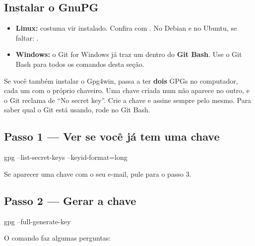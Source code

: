 \subsection{Instalar o GnuPG}

\begin{itemize}
  \item \textbf{Linux:} costuma vir instalado. Confira com . No Debian e no Ubuntu, se faltar: .
  \item \textbf{Windows:} o Git for Windows já traz um  dentro do \textbf{Git Bash}. Use o Git Bash para todos os comandos desta seção.
\end{itemize}

\begin{atencao}
Se você também instalar o Gpg4win, passa a ter \textbf{dois} GPGs no computador, cada um com o próprio chaveiro. Uma chave criada num não aparece no outro, e o Git reclama de \enquote{No secret key}. Crie a chave e assine sempre pelo mesmo. Para saber qual o Git está usando, rode  no Git Bash.
\end{atencao}

\subsection{Passo 1 — Ver se você já tem uma chave}

\begin{terminal}
gpg --list-secret-keys --keyid-format=long
\end{terminal}

Se aparecer uma chave com o seu e-mail, pule para o passo 3.

\subsection{Passo 2 — Gerar a chave}

\begin{terminal}
gpg --full-generate-key
\end{terminal}

O comando faz algumas perguntas:

